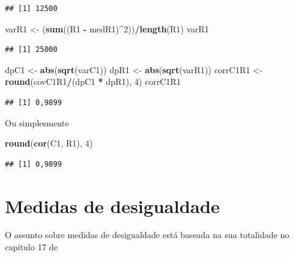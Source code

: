 \documentclass[
]{book}
\newenvironment{Shaded}{\begin{snugshade}}{\end{snugshade}}
\newcommand{\DecValTok}[1]{\textcolor[rgb]{0.00,0.00,0.81}{#1}}
\newcommand{\KeywordTok}[1]{\textcolor[rgb]{0.13,0.29,0.53}{\textbf{#1}}}
\newcommand{\NormalTok}[1]{#1}
\newcommand{\OperatorTok}[1]{\textcolor[rgb]{0.81,0.36,0.00}{\textbf{#1}}}
\newcommand{\StringTok}[1]{\textcolor[rgb]{0.31,0.60,0.02}{#1}}
\begin{document}
\begin{verbatim}
## [1] 12500
\end{verbatim}

\begin{Shaded}
\begin{Highlighting}[]
\NormalTok{varR1 <-}\StringTok{ }\NormalTok{(}\KeywordTok{sum}\NormalTok{((R1 }\OperatorTok{-}\StringTok{ }\NormalTok{medR1)}\OperatorTok{^}\DecValTok{2}\NormalTok{))}\OperatorTok{/}\KeywordTok{length}\NormalTok{(R1)}
\NormalTok{varR1}
\end{Highlighting}
\end{Shaded}

\begin{verbatim}
## [1] 25000
\end{verbatim}

\begin{Shaded}
\begin{Highlighting}[]
\NormalTok{dpC1 <-}\StringTok{ }\KeywordTok{abs}\NormalTok{(}\KeywordTok{sqrt}\NormalTok{(varC1))}
\NormalTok{dpR1 <-}\StringTok{ }\KeywordTok{abs}\NormalTok{(}\KeywordTok{sqrt}\NormalTok{(varR1))}
\NormalTok{corrC1R1 <-}\StringTok{ }\KeywordTok{round}\NormalTok{(covC1R1}\OperatorTok{/}\NormalTok{(dpC1 }\OperatorTok{*}\StringTok{ }\NormalTok{dpR1), }\DecValTok{4}\NormalTok{)}
\NormalTok{corrC1R1}
\end{Highlighting}
\end{Shaded}

\begin{verbatim}
## [1] 0,9899
\end{verbatim}

Ou simplesmente

\begin{Shaded}
\begin{Highlighting}[]
\KeywordTok{round}\NormalTok{(}\KeywordTok{cor}\NormalTok{(C1, R1), }\DecValTok{4}\NormalTok{)}
\end{Highlighting}
\end{Shaded}

\begin{verbatim}
## [1] 0,9899
\end{verbatim}

\hypertarget{medidas-de-desigualdade}{%
\chapter{Medidas de desigualdade}\label{medidas-de-desigualdade}}

O assunto sobre medidas de desigualdade está baseada na sua totalidade no capítulo 17 de \citet{Hoffmann2006}
\end{document}
